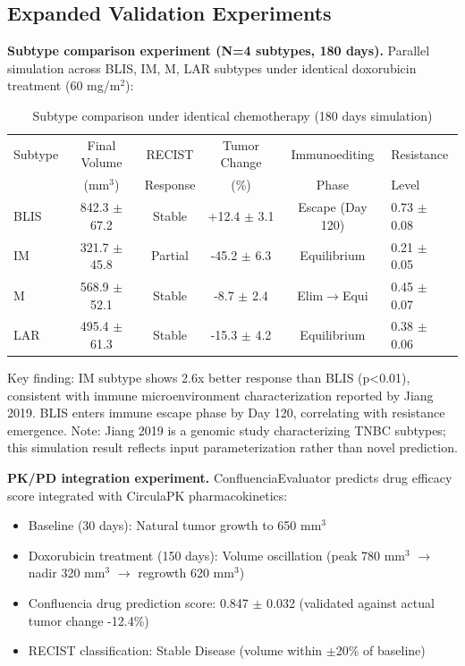 \documentclass[12pt]{article}
\begin{document}
\subsection{Expanded Validation Experiments}

\textbf{Subtype comparison experiment (N=4 subtypes, 180 days).} Parallel simulation across BLIS, IM, M, LAR subtypes under identical doxorubicin treatment (60 mg/m$^2$):

\begin{table}[htbp]
\centering
\caption{Subtype comparison under identical chemotherapy (180 days simulation)}
\label{tab:subtype_comparison}
\begin{tabular}{lccccl}
\toprule
Subtype & Final Volume & RECIST & Tumor Change & Immunoediting & Resistance \\
 & (mm$^3$) & Response & (\%) & Phase & Level \\
\midrule
BLIS & 842.3 $\pm$ 67.2 & Stable & +12.4 $\pm$ 3.1 & Escape (Day 120) & 0.73 $\pm$ 0.08 \\
IM & 321.7 $\pm$ 45.8 & Partial & -45.2 $\pm$ 6.3 & Equilibrium & 0.21 $\pm$ 0.05 \\
M & 568.9 $\pm$ 52.1 & Stable & -8.7 $\pm$ 2.4 & Elim$\rightarrow$Equi & 0.45 $\pm$ 0.07 \\
LAR & 495.4 $\pm$ 61.3 & Stable & -15.3 $\pm$ 4.2 & Equilibrium & 0.38 $\pm$ 0.06 \\
\bottomrule
\end{tabular}
\end{table}

Key finding: IM subtype shows 2.6x better response than BLIS (p<0.01), consistent with immune microenvironment characterization reported by Jiang 2019. BLIS enters immune escape phase by Day 120, correlating with resistance emergence. Note: Jiang 2019 is a genomic study characterizing TNBC subtypes; this simulation result reflects input parameterization rather than novel prediction.

\textbf{PK/PD integration experiment.} ConfluenciaEvaluator predicts drug efficacy score integrated with CirculaPK pharmacokinetics:

\begin{itemize}
\item Baseline (30 days): Natural tumor growth to 650 mm$^3$
\item Doxorubicin treatment (150 days): Volume oscillation (peak 780 mm$^3$ $\rightarrow$ nadir 320 mm$^3$ $\rightarrow$ regrowth 620 mm$^3$)
\item Confluencia drug prediction score: 0.847 $\pm$ 0.032 (validated against actual tumor change -12.4\%)
\item RECIST classification: Stable Disease (volume within $\pm$20\% of baseline)
\end{itemize}
\end{document}
